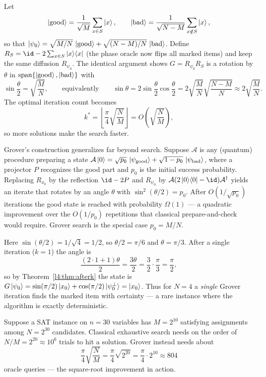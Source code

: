 Let
\[
  \ket{\mathrm{good}}=\frac{1}{\sqrt M}\sum_{x\in S}\ket{x},
  \qquad
  \ket{\mathrm{bad}}=\frac{1}{\sqrt{N-M}}\sum_{x\notin S}\ket{x},
\]
so that $\ket{\psi_0}=\sqrt{M/N}\,\ket{\mathrm{good}}+\sqrt{(N-M)/N}\,\ket{\mathrm{bad}}$.
Define $R_S=\id-2\sum_{x\in S}\ketbra{x}{x}$ (the phase oracle now flips all marked
items) and keep the same diffusion $R_{\psi_0}$. The identical argument shows
$G=R_{\psi_0}R_S$ is a rotation by $\theta$ in
$\operatorname{span}\{\ket{\mathrm{good}},\ket{\mathrm{bad}}\}$ with
\[
  \sin\frac{\theta}{2}=\sqrt{\frac{M}{N}},
  \qquad\text{equivalently}\qquad
  \sin\theta=2\sin\frac{\theta}{2}\cos\frac{\theta}{2}
            =2\sqrt{\frac{M}{N}}\sqrt{\frac{N-M}{N}}\approx 2\sqrt{\frac{M}{N}}.
\]
The optimal iteration count becomes
\[
  k^{\ast}=\left\lfloor\frac{\pi}{4}\sqrt{\frac{N}{M}}\right\rfloor
  =O\!\left(\sqrt{\frac{N}{M}}\right),
\]
so more solutions make the search faster.

\begin{remark}
Grover's construction generalizes far beyond search. Suppose $\mathcal A$ is any
(quantum) procedure preparing a state
$\mathcal A\ket{0}=\sqrt{p_0}\,\ket{\psi_{\mathrm{good}}}+\sqrt{1-p_0}\,\ket{\psi_{\mathrm{bad}}}$,
where a projector $P$ recognizes the good part and $p_0$ is the initial success
probability. Replacing $R_{x_0}$ by the reflection $\id-2P$ and $R_{\psi_0}$ by
$\mathcal A(2\ketbra{0}{0}-\id)\mathcal A^{\dagger}$ yields an iterate that rotates
by an angle $\theta$ with $\sin^{2}(\theta/2)=p_0$. After $O(1/\sqrt{p_0})$
iterations the good state is reached with probability $\Omega(1)$ --- a quadratic
improvement over the $O(1/p_0)$ repetitions that classical
prepare-and-check would require. Grover search is the special case
$p_0=M/N$.
\end{remark}

\begin{example}[The exact case $N=4$, $M=1$]
Here $\sin(\theta/2)=1/\sqrt4=1/2$, so $\theta/2=\pi/6$ and $\theta=\pi/3$. After a
single iteration ($k=1$) the angle is
\[
  \frac{(2\cdot1+1)\theta}{2}=\frac{3\theta}{2}=\frac{3}{2}\cdot\frac{\pi}{3}=\frac{\pi}{2},
\]
so by Theorem~\ref{l4:thm:afterk} the state is
$G\ket{\psi_0}=\sin(\pi/2)\ket{x_0}+\cos(\pi/2)\ket{\psi_0^{\perp}}=\ket{x_0}$.
Thus for $N=4$ a \emph{single} Grover iteration finds the marked item with
certainty --- a rare instance where the algorithm is exactly deterministic.
\end{example}

\begin{example}
Suppose a SAT instance on $n=30$ variables has $M=2^{10}$ satisfying assignments
among $N=2^{30}$ candidates. Classical exhaustive search needs on the order of
$N/M=2^{20}\approx10^{6}$ trials to hit a solution. Grover instead needs about
\[
  \frac{\pi}{4}\sqrt{\frac{N}{M}}
    =\frac{\pi}{4}\sqrt{2^{20}}
    =\frac{\pi}{4}\cdot2^{10}\approx804
\]
oracle queries --- the square-root improvement in action.
\end{example}

